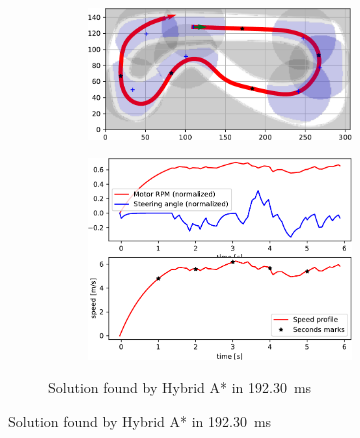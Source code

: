 
\begin{figure}[!tbp]%
	\centering

	\begin{subfigure}[t]{\textwidth}
		\begin{subfigure}[t]{0.45\textwidth}
			\includegraphics[width=\textwidth]{../img/experiments/porto-hybrid_astar-trajectory}
		\end{subfigure}
		\hfill
		\begin{subfigure}[t]{0.45\textwidth}
			\includegraphics[width=\textwidth]{../img/experiments/porto-hybrid_astar-actuators}
		\end{subfigure}
		\caption{Solution found by Hybrid A* in \SI{192.30}{\milli\second}}
		\label{fig:solution_porto-hybrid_astar}	
	\end{subfigure}
	
	\vspace{0.75cm}
	

\end{figure}

